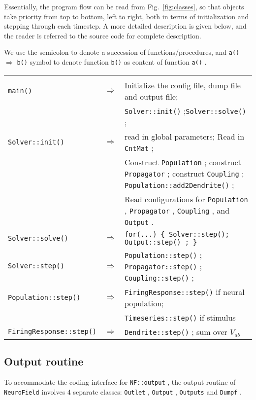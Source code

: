 \documentclass[12pt,a4paper]{article}
\newcommand{\type}[1]{{\small\small\tt #1} }
\newcommand{\NF}[0]{\type{NeuroField}}
\begin{document}
Essentially, the program flow can be read from Fig.~\ref{fig:classes}, so that objects take priority from top to bottom, left to right, both in terms of initialization and stepping through each timestep. A more detailed description is given below, and the reader is referred to the source code for complete description.

We use the semicolon to denote a succession of functions/procedures, and \type{a()} $\Rightarrow$ \type{b()} symbol to denote function \type{b()} as content of function \type{a()}.

\begin{center}
\begin{tabular}{ | l l p{11cm} | }
\hline \\

\type{main()}& $\Rightarrow$ &Initialize the config file, dump file and output file;\\[6pt]
&&\type{Solver::init()};\type{Solver::solve()};\\[6pt]
\type{Solver::init()}& $\Rightarrow$ &read in global parameters; Read in \type{CntMat};\\[6pt]
&&Construct \type{Population}; construct \type{Propagator}; construct \type{Coupling}; \type{Population::add2Dendrite()};\\[6pt]
&&Read configurations for \type{Population}, \type{Propagator}, \type{Coupling}, and \type{Output}.\\[6pt]
\type{Solver::solve()}& $\Rightarrow$ & \type{for(...) \{ Solver::step(); \type{Output::step()}; \} }\\[6pt]
\type{Solver::step()}& $\Rightarrow$ & \type{Population::step()}; \type{Propagator::step()}; \type{Coupling::step()};\\[6pt]
\type{Population::step()}& $\Rightarrow$ & \type{FiringResponse::step()} if neural population;\\[6pt]
&&\type{Timeseries::step()} if stimulus\\[6pt]
\type{FiringResponse::step()}& $\Rightarrow$ & \type{Dendrite::step()}; sum over \(V_{ab}\)

\\\hline
\end{tabular}
\end{center}

\subsection{Output routine}

To accommodate the coding interface for \type{NF::output}, the output routine of \NF involves 4 separate classes: \type{Outlet}, \type{Output}, \type{Outputs} and \type{Dumpf}.
\end{document}
